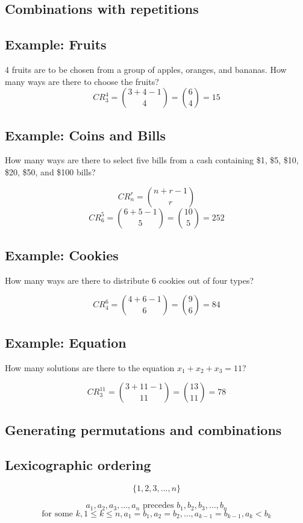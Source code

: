 \documentclass[11pt]{article}
\begin{document}
\subsection{Combinations with repetitions}

\subsection*{Example: Fruits}
4 fruits are to be chosen from a group of apples, oranges, and bananas. How many ways are there to choose the fruits?
\[
CR_3^4 = \binom{3 + 4 - 1}{4} = \binom{6}{4} = 15
\]

\subsection*{Example: Coins and Bills}
How many ways are there to select five bills from a cash containing \$1, \$5, \$10, \$20, \$50, and \$100 bills?

\[
CR_n^r = \binom{n + r - 1}{r}
\]
\[
CR_6^5 = \binom{6 + 5 - 1}{5} = \binom{10}{5} = 252
\]

\subsection*{Example: Cookies}
How many ways are there to distribute 6 cookies out of four types?

\[
CR_4^6 = \binom{4 + 6 - 1}{6} = \binom{9}{6} = 84
\]

\subsection*{Example: Equation}
How many solutions are there to the equation $x_1 + x_2 + x_3 = 11$?

\[
CR_3^{11} = \binom{3 + 11 - 1}{11} = \binom{13}{11} = 78
\]

\subsection{Generating permutations and combinations}
\subsection*{Lexicographic ordering}
\[
\{1,2,3, \dots , n\}
\]

\[
a_1, a_2, a_3, \dots,  a_n \text{ precedes } b_1, b_2, b_3, \dots, b_n 
\]
\[
\text{for some } k, 1 \leq k \leq n, a_1 = b_1, a_2 = b_2, \dots, a_{k-1} = b_{k-1}, a_k < b_k
\]
\end{document}
